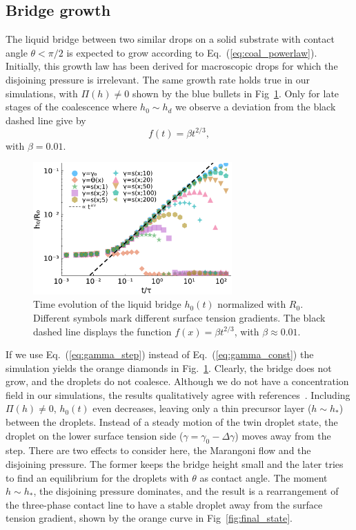 \subsection{Bridge growth}\label{subsec:growth}
The liquid bridge between two similar drops on a solid substrate with contact angle $\theta < \pi/2$ is expected to grow according to Eq.~(\ref{eq:coal_powerlaw}). 
Initially, this growth law has been derived for macroscopic drops for which the disjoining pressure is irrelevant.
The same growth rate holds true in our simulations, with $\Pi(h) \neq 0$ shown by the blue bullets in Fig~\ref{fig:bridge_growth}.
Only for late stages of the coalescence where $h_0 \sim h_d$ we observe a deviation from the black dashed line give by
\begin{equation}\label{eq:fit_powerlaw}
    f(t) = \beta t^{2/3},
\end{equation}
with $\beta = 0.01$.
\begin{figure}
    \centering
    \includegraphics[width=0.68\textwidth]{graphics/bridge_evo_all_2.pdf}
    \caption{Time evolution of the liquid bridge $h_0(t)$ normalized with $R_0$. 
    Different symbols mark different surface tension gradients.
    The black dashed line displays the function $f(x) = \beta t^{2/3}$, with $\beta \approx 0.01$.}
    \label{fig:bridge_growth}
\end{figure} 

If we use Eq.~(\ref{eq:gamma_step}) instead of Eq.~(\ref{eq:gamma_const}) the simulation yields the orange diamonds in Fig.~\ref{fig:bridge_growth}.
Clearly, the bridge does not grow, and the droplets do not coalesce.
Although we do not have a concentration field in our simulations, the results qualitatively agree with references~\cite{karpitschka2014sharp, doi:10.1021/la500459v, PhysRevLett.109.066103, doi:10.1021/la800630w}. 
Including $\Pi(h) \neq 0$, $h_0(t)$ even decreases, leaving only a thin precursor layer ($h\sim h_{\ast}$) between the droplets.
Instead of a steady motion of the twin droplet state, the droplet on the lower surface tension side ($\gamma = \gamma_0 - \Delta\gamma$) moves away from the step.
There are two effects to consider here, the Marangoni flow and the disjoining pressure.
The former keeps the bridge height small and the later tries to find an equilibrium for the droplets with $\theta$ as contact angle.
The moment $h\sim h_{\ast}$, the disjoining pressure dominates, and the result is a rearrangement of the three-phase contact line to have a stable droplet away from the surface tension gradient, shown by the orange curve in Fig~\ref{fig:final_state}.

